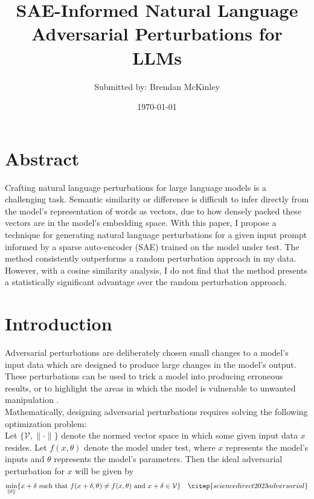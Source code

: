 \documentclass{article}
\title{SAE-Informed Natural Language Adversarial Perturbations for LLMs}
\author{Submitted by: Brendan McKinley}
\date\today
\begin{document}
  
\maketitle 

\section*{Abstract}

Crafting natural language perturbations for large language models is a challenging task. Semantic similarity or difference is difficult to infer directly from the model's representation of words as vectors, due to how densely packed these vectors are in the model's embedding space. With this paper, I propose a technique for generating natural language perturbations for a given input prompt informed by a sparse auto-encoder (SAE) trained on the model under test. The method consistently outperforms a random perturbation approach in my data. However, with a cosine similarity analysis, I do not find that the method presents a statistically significant advantage over the random perturbation approach. 

\section*{Introduction}

Adversarial perturbations are deliberately chosen small changes to a model's input data which are designed to produce large changes in the model's output. These perturbations can be used to trick a model into producing erroneous results, or to highlight the areas in which the model is vulnerable to unwanted manipulation \citep{youtube2024video} \citep{adversarialrobustness2024}.\\ 

Mathematically, designing adversarial perturbations requires solving the following optimization problem:\\

Let $\{\mathcal{V}, \lVert \cdot \rVert\}$ denote the normed vector space in which some given input data $x$ resides. Let $f(x, \theta)$ denote the model under test, where $x$ represents the model's inputs and $\theta$ represents the model's parameters. Then the ideal adversarial perturbation for $x$ will be given by
\begin{align*}
\min\limits_{\lVert \delta \rVert}\{x + \delta \text{ such that } f(x + \delta, \theta) \ne f(x, \theta) \text{ and } x + \delta \in \mathcal{V}\} && \citep{sciencedirect2023adversarial}
\end{align*}
\end{document}
